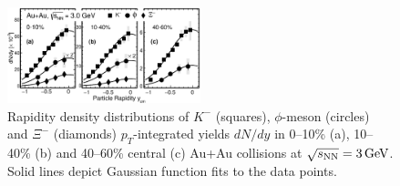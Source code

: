 \documentclass[%
 reprint,	
showpacs,
 amsmath,amssymb,
 aps,
 prc,
]{revtex4-1}
\begin{document}
\begin{figure}
\centering
\hspace*{-4mm}
\includegraphics[width=0.5\textwidth]{fig/fig3_dndy.eps}
  \caption{Rapidity density distributions of $K^-$ (squares), $\phi$-meson (circles) and $\Xi^-$ (diamonds) $p_T$-integrated yields $dN/dy$ in 0--10\% (a), 10--40\% (b) and 40--60\% central (c) Au+Au collisions at ${\sqrt{s_{\rm NN}} = \rm{3\,GeV}}$. %
  Solid lines depict Gaussian function fits to the data points.}
\label{fig:phiYSpectra} 
\end{figure}
\end{document}
